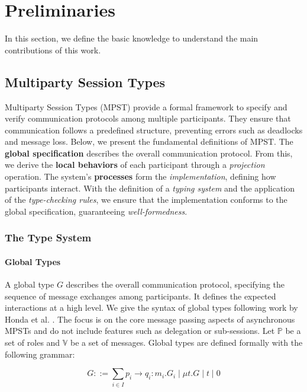 \section{Preliminaries}
In this section, we define the basic knowledge to understand the main contributions
of this work.

\subsection{Multiparty Session Types}

Multiparty Session Types (MPST) provide a formal framework to specify and verify
communication protocols among multiple participants. They ensure that communication
follows a predefined structure, preventing errors such as deadlocks and message loss.
Below, we present the fundamental definitions of MPST. The \textbf{global specification}  
describes the overall communication protocol. From this, we derive the \textbf{local behaviors}  
of each participant through a \textit{projection} operation. The system's \textbf{processes}  
form the \textit{implementation}, defining how participants interact.  
With the definition of a \textit{typing system} and the application of the \textit{type-checking rules},
we ensure that the implementation conforms to the global specification, guaranteeing \textit{well-formedness}.

\subsubsection{The Type System}

\paragraph{Global Types}
A global type $G$ describes the overall communication protocol, specifying the
sequence of message exchanges among participants. It defines the expected
interactions at a high level.
We give the syntax of global types following work by Honda et al. \cite{honda2008multiparty}.
The focus is on the core message passing aspects of asynchronous MPSTs 
and do not include features such as delegation or sub-sessions.
Let $\mathbb{P}$ be a set of roles and $\mathbb{V}$ be a set of messages.
Global types are defined formally with the following grammar:

\begin{equation}
G ::= \sum_{i\in I} p_i \to q_i : m_i . G_i \mid \mu t. G \mid t \mid 0
\end{equation}

